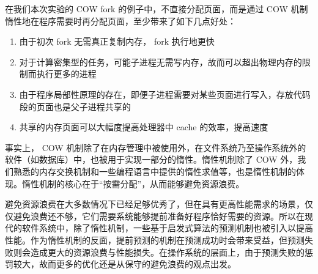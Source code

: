 在我们本次实验的 COW fork 的例子中，不直接分配页面，而是通过 COW 机制惰性地在程序需要时再分配页面，至少带来了如下几点好处：
\begin{enumerate}
    \item 由于初次 fork 无需真正复制内存， fork 执行地更快
    \item 对于计算密集型的任务，可能子进程无需写内存，故而可以超出物理内存的限制而执行更多的进程
    \item 由于程序局部性原理的存在，即便子进程需要对某些页面进行写入，存放代码段的页面也是父子进程共享的
    \item 共享的内存页面可以大幅度提高处理器中 cache 的效率，提高速度
\end{enumerate}

事实上， COW 机制除了在内存管理中被使用外，在文件系统乃至操作系统外的软件（如数据库）中，也被用于实现一部分的惰性。惰性机制除了 COW 外，我们熟悉的内存交换机制和一些编程语言中提供的惰性求值等，也是惰性机制的体现。惰性机制的核心在于“按需分配”，从而能够避免资源浪费。

避免资源浪费在大多数情况下已经足够优秀了，但在具有更高性能需求的场景，仅仅避免浪费还不够，它们需要系统能够提前准备好程序恰好需要的资源。所以在现代的软件系统中，除了惰性机制，一些基于启发式算法的预测机制也被引入以提高性能。作为惰性机制的反面，提前预测的机制在预测成功时会带来受益，但预测失败则会造成更大的资源浪费与性能损失。在操作系统的层面上，由于预测失败的惩罚较大，故而更多的优化还是从保守的避免浪费的观点出发。